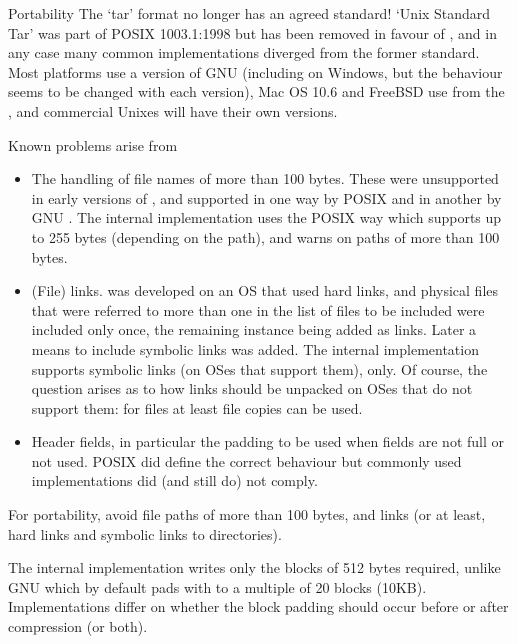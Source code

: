 %
\begin{Section}{Portability}
The `tar' format no longer has an agreed standard!
`Unix Standard Tar' was part of POSIX 1003.1:1998 but has been
removed in favour of , and in any case many common
implementations diverged from the former standard.  Most \R{} platforms
use a version of GNU  (including  on
Windows, but the behaviour seems to be changed with each version), Mac
OS 10.6 and FreeBSD use  from the , and commercial Unixes will have their own versions.

Known problems arise from
\begin{itemize}

\item The handling of file names of more than 100 bytes.  These were
unsupported in early versions of , and supported in one
way by POSIX  and in another by GNU .  The
internal implementation uses the POSIX way which supports up to 255
bytes (depending on the path), and warns on paths of more than 100
bytes.

\item (File) links.   was developed on an OS that used
hard links, and physical files that were referred to more than one
in the list of files to be included were included only once, the
remaining instance being added as links.  Later a means to include
symbolic links was added.  The internal implementation supports
symbolic links (on OSes that support them), only.  Of course, the
question arises as to how links should be unpacked on OSes that do
not support them: for files at least file copies can be used.

\item Header fields, in particular the padding to be used when
fields are not full or not used.  POSIX did define the correct
behaviour but commonly used implementations did (and still do)
not comply.

\end{itemize}

For portability, avoid file paths of more than 100 bytes, and links
(or at least, hard links and symbolic links to directories).

The internal implementation writes only the blocks of 512 bytes
required, unlike GNU  which by default pads with
 to a multiple of 20 blocks (10KB).  Implementations differ
on whether the block padding should occur before or after compression
(or both).
\end{Section}
